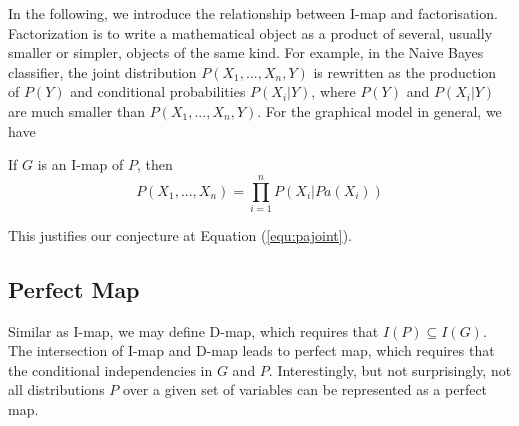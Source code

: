 In the following, we introduce the relationship between I-map and factorisation. Factorization is to write a mathematical object as a product of several, usually smaller or simpler, objects of the same kind. For example, in the Naive Bayes classifier, the joint distribution $P(X_1,...,X_n,Y)$ is rewritten as the production of $P(Y)$ and conditional probabilities $P(X_i|Y)$, where $P(Y)$ and $P(X_i|Y)$ are much smaller than $P(X_1,...,X_n,Y)$. For the graphical model in general, we have 

\begin{theorem}
If $G$ is an I-map of $P$, then 
\begin{equation}
    P(X_1,...,X_n) = \prod_{i=1}^n P(X_i|Pa(X_i))
\end{equation}
\end{theorem}
This justifies our conjecture at Equation (\ref{equ:pajoint}). 

\subsection{Perfect Map}

Similar as I-map, we may define D-map, which requires that $I(P)\subseteq I(G)$. The intersection of I-map and D-map leads to perfect map, which requires that the conditional independencies in $G$ and $P$. 
Interestingly, but not surprisingly, not all distributions $P$ over a given set of variables can be represented as a perfect map. 

